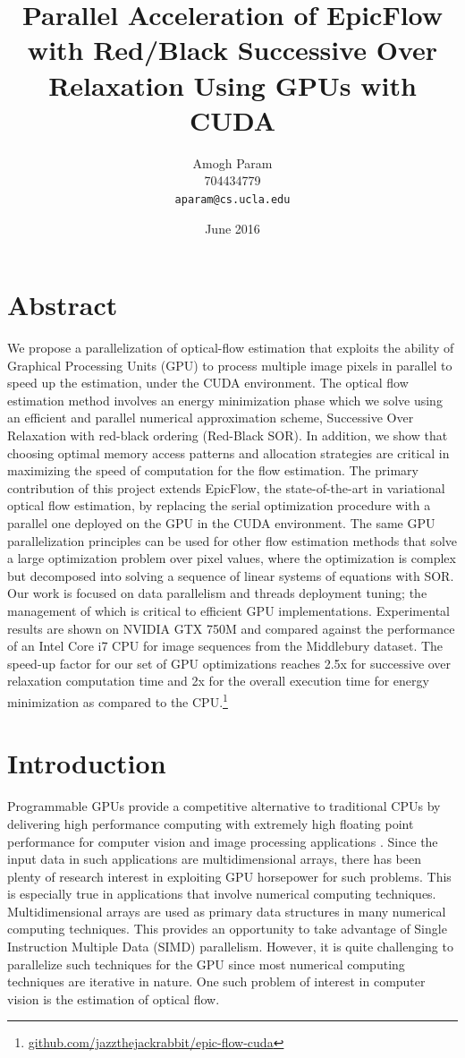 \documentclass[english]{article}
\title{Parallel Acceleration of EpicFlow with Red/Black Successive Over Relaxation Using GPUs with CUDA}
\author{
  Amogh Param\\
  704434779\\
  \texttt{aparam@cs.ucla.edu}
}
\date{June 2016}
\begin{document}
    \maketitle
     
	\section*{Abstract}  
	We propose a parallelization of optical-flow estimation that exploits the ability of Graphical Processing Units (GPU) to process multiple image pixels in parallel to speed up the estimation, under the CUDA environment. The optical flow estimation method involves an energy minimization phase which we solve using an efficient and parallel numerical approximation scheme, Successive Over Relaxation with red-black ordering (Red-Black SOR). In addition, we show that choosing optimal memory  access patterns and allocation strategies are critical in maximizing the speed of computation for the flow estimation. The primary contribution of this project extends EpicFlow\cite{1}, the state-of-the-art in variational optical flow estimation, by replacing the serial optimization procedure with a parallel one deployed on the GPU in the CUDA environment. The same GPU parallelization principles can be used for other flow estimation methods that solve a large optimization problem over pixel values, where the optimization is complex but decomposed into solving a sequence of linear systems of equations with SOR. Our work is focused on data parallelism and threads deployment tuning; the management of which is critical to efficient GPU implementations. Experimental results are shown on NVIDIA GTX 750M and compared against the performance of an Intel Core i7 CPU for image sequences from the Middlebury dataset. The speed-up factor for our set of GPU optimizations reaches 2.5x for successive over relaxation computation time and 2x for the overall execution time for energy minimization as compared to the CPU.\footnote{\href{https://github.com/jazzthejackrabbit/epic-flow-cuda}{github.com/jazzthejackrabbit/epic-flow-cuda}}

    \section{Introduction}
	Programmable GPUs provide a competitive alternative to traditional CPUs by delivering high performance computing with extremely high floating point performance for computer vision and image processing applications \cite{6}. Since the input data in such applications are multidimensional arrays, there has been plenty of research interest in exploiting GPU horsepower for such problems. This is especially true in applications that involve numerical computing techniques. Multidimensional arrays are used as primary data structures in many numerical computing techniques. This provides an opportunity to take advantage of Single Instruction Multiple Data (SIMD) parallelism. However, it is quite challenging to parallelize such techniques for the GPU since most numerical computing techniques are iterative in nature. One such problem of interest in computer vision is the estimation of optical flow.\newline
\end{document}
